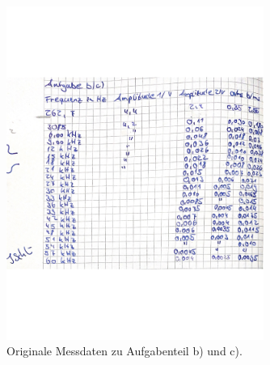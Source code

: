 \begin{figure}
    \centering
    \includegraphics[width=0.75\textwidth]{Dateien/daten2.jpg}
    \caption{Originale Messdaten zu Aufgabenteil b) und c).}
    \label{fig:daten2}
\end{figure}